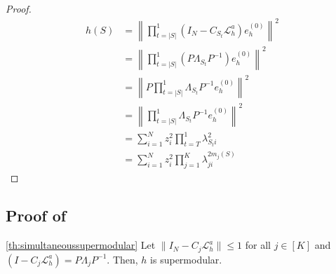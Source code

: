 \documentclass{article}
\begin{document}
\begin{proof}

\begin{align*}
    h(S) &= \left\|\prod_{t = |S|}^1\left(I_N - C_{S_t} \mathcal{L}_{h}^a\right)  e^{(0)}_h \right\|^2 \\
    &=  \left\|\prod_{t = |S|}^1\left(P\Lambda_{S_t}P^{-1}\right)  e^{(0)}_h \right\|^2 \\
    &=  \left\|P\prod_{t = |S|}^1\Lambda_{S_t}P^{-1}  e^{(0)}_h \right\|^2 \\
    &= \left\|\prod_{t = |S|}^1\Lambda_{S_t}P^{-1}  e^{(0)}_h \right\|^2\\
    &=  \sum_{i = 1}^N z_i^2 \prod_{t = T}^1 \lambda_{S_ti}^2 \\
    &=  \sum_{i = 1}^N z_i^2 \prod_{j = 1}^K \lambda_{ji}^{2m_j(S)} 
\end{align*}

\end{proof}

\subsection{Proof of } \label{sec:proofsimultaneoussupermodular}
\begin{customproposition}{\ref{th:simultaneoussupermodular}}
    Let $\|I_N - C_j\mathcal{L}_h^a\| \leq 1$ for all $j \in [K]$ and $\left(I - C_j \mathcal{L}_{h}^a\right) = P\Lambda_jP^{-1}$. Then, $h$ is supermodular. 
\end{customproposition}
\end{document}
